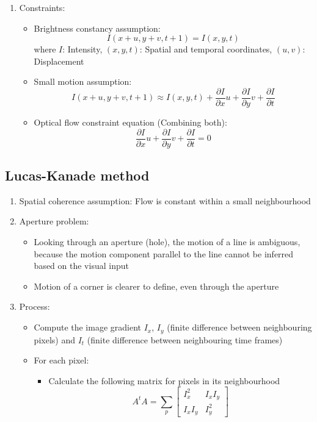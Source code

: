 \documentclass[9pt]{article}
\begin{document}
\begin{multicols*}{2}
\begin{enumerate}
        \item Constraints:
        \begin{itemize}
            \item Brightness constancy assumption: 
            $$
                I(x + u,y + v,t + 1) = I(x,y,t)
            $$
            where $I$: Intensity, $(x,y,t)$: Spatial and temporal coordinates, $(u,v)$: Displacement

            \item Small motion assumption:
            $$
                I(x+u,y+v,t+1) \approx I(x,y,t) + \frac{\partial I}{\partial x}u + \frac{\partial I}{\partial y}v + \frac{\partial I}{\partial t}
            $$

            \item Optical flow constraint equation (Combining both): 
            $$
                \frac{\partial I}{\partial x}u + \frac{\partial I}{\partial y}v + \frac{\partial I}{\partial t} = 0
            $$
        \end{itemize}
    \end{enumerate}

    \subsection{Lucas-Kanade method}
    \begin{enumerate}
        \item Spatial coherence assumption: Flow is constant within a small neighbourhood
        \item Aperture problem:
        \begin{itemize}
            \item Looking through an aperture (hole), the motion of a line is ambiguous, because the motion component parallel to the line cannot be 
            inferred based on the visual input
            \item Motion of a corner is clearer to define, even through the aperture
        \end{itemize}

        \item Process:
        \begin{itemize}
            \item Compute the image gradient $I_x$, $I_y$ (finite difference between neighbouring pixels) and $I_t$ (finite difference between neighbouring time frames)
            \item For each pixel:
            \begin{itemize}
                \item Calculate the following matrix for pixels in its neighbourhood
                $$
                    A^tA = \sum_p \begin{bmatrix}
                        I_x^2 & I_x I_y \\ 
                        I_x I_y & I_y^2
                    \end{bmatrix}
                $$


\end{itemize}
\end{itemize}
\end{enumerate}
\end{multicols*}
\end{document}

